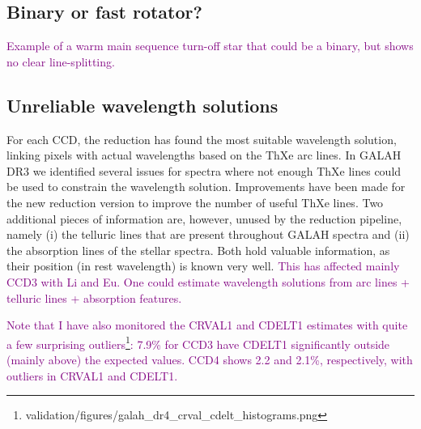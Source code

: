 \documentclass[
  journal=pasa,
  manuscript=research-paper, %
  year=2023,
  volume=37
]{cup-journal}
\newcommand{\SB}[1]{{\textcolor{purple}{#1}}}
\begin{document}
\subsection{Binary or fast rotator?}

\SB{Example of a warm main sequence turn-off star that could be a binary, but shows no clear line-splitting.}

\subsection{Unreliable wavelength solutions}

For each CCD, the reduction has found the most suitable wavelength solution, linking pixels with actual wavelengths based on the ThXe arc lines. In GALAH DR3 \citep{Buder2021} we identified several issues for spectra where not enough ThXe lines could be used to constrain the wavelength solution. Improvements have been made for the new reduction version to improve the number of useful ThXe lines. Two additional pieces of information are, however, unused by the reduction pipeline, namely (i) the telluric lines that are present throughout GALAH spectra and (ii) the absorption lines of the stellar spectra. Both hold valuable information, as their position (in rest wavelength) is known very well. \SB{This has affected mainly CCD3 with Li and Eu. One could estimate wavelength solutions from arc lines + telluric lines + absorption features.}

\SB{Note that I have also monitored the CRVAL1 and CDELT1 estimates with quite a few surprising outliers\footnote{validation/figures/galah\_dr4\_crval\_cdelt\_histograms.png}: 7.9\% for CCD3 have CDELT1 significantly outside (mainly above) the expected values. CCD4 shows 2.2 and 2.1\%, respectively, with outliers in CRVAL1 and CDELT1.}

\end{document}
